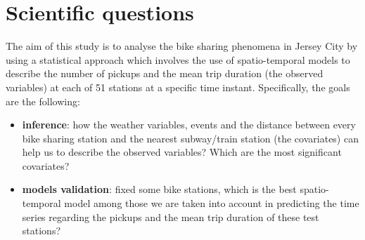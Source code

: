 \section{Scientific questions}

The aim of this study is to analyse the bike sharing phenomena in Jersey City by using a statistical approach which involves the use of spatio-temporal models to describe the number of pickups and the mean trip duration (the observed variables) at each of \num{51} stations at a specific time instant. Specifically, the goals are the following:
\begin{itemize}
	\item \textbf{inference}: how the weather variables, events and the distance between every bike sharing station and the nearest subway/train station (the covariates) can help us to describe the observed variables? Which are the most significant covariates?
	\item \textbf{models validation}: fixed some bike stations, which is the best spatio-temporal model among those we are taken into account in predicting the time series regarding the pickups and the mean trip duration of these test stations?
\end{itemize}